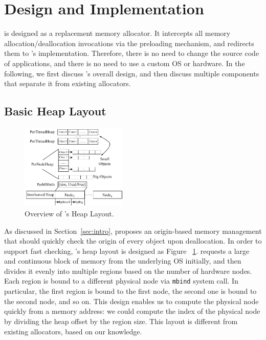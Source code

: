 \section{Design and Implementation}
\label{sec:implement}

\NM{} is designed as a replacement memory allocator. It intercepts all memory allocation/deallocation invocations via the preloading mechanism, and redirects them to \NM{}'s implementation. Therefore, there is no need to change the source code of applications, and there is no need to use a custom OS or hardware. In the following, we first discuss \NM{}'s overall design, and then discuss multiple components that separate it from existing allocators.

\subsection{Basic Heap Layout}
\label{sec:overview}

\begin{figure}[!ht]
\begin{center}
\includegraphics[width=0.45\textwidth]{figure/heaplayout1}
\end{center}
\caption{Overview of \NA{}'s Heap Layout.
\label{fig:overview}}
\end{figure}

As discussed in Section~\ref{sec:intro}, \NM{} proposes an origin-based memory management that should quickly check the origin of every object upon deallocation. In order to support fast checking, \NM{}'s heap layout is designed as  Figure ~\ref{fig:overview}. \NM{} requests a large and continuous block of memory from the underlying OS initially, and then divides it evenly into multiple regions based on the number of hardware nodes. Each region is bound to a different physical node via \texttt{mbind} system call. In particular, the first region is bound to the first node, the second one is bound to the second node, and so on. This design enables us to compute the physical node quickly from a memory address: we could compute the index of the physical node by dividing the heap offset by the region size. This layout is different from existing allocators, based on our knowledge. %

